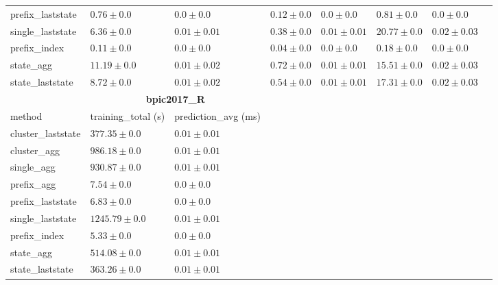 \documentclass[twoside,11pt]{Latex/Classes/PhDthesisPSnPDF}
\begin{document}
\begin{table}[!htbp]
{\begin{tabular}{llllllll}
			prefix\_laststate & $0.76 \pm 0.0$ & $\mathbf{0.0 \pm 0.0}$ & $0.12 \pm 0.0$ & $\mathbf{0.0 \pm 0.0}$ & $0.81 \pm 0.0$ & $\mathbf{0.0 \pm 0.0}$ \\ 
			single\_laststate & $6.36 \pm 0.0$ & $0.01 \pm 0.01$ & $0.38 \pm 0.0$ & $0.01 \pm 0.01$ & $20.77 \pm 0.0$ & $0.02 \pm 0.03$ \\ 
			prefix\_index & $\mathbf{0.11 \pm 0.0}$ & $\mathbf{0.0 \pm 0.0}$ & $\mathbf{0.04 \pm 0.0}$ & $\mathbf{0.0 \pm 0.0}$ & $\mathbf{0.18 \pm 0.0}$ & $\mathbf{0.0 \pm 0.0}$ \\ 
			state\_agg & $11.19 \pm 0.0$ & $0.01 \pm 0.02$ & $0.72 \pm 0.0$ & $0.01 \pm 0.01$ & $15.51 \pm 0.0$ & $0.02 \pm 0.03$ \\ 
			state\_laststate & $8.72 \pm 0.0$ & $0.01 \pm 0.02$ & $0.54 \pm 0.0$ & $0.01 \pm 0.01$ & $17.31 \pm 0.0$ & $0.02 \pm 0.03$ \\ 
			\bottomrule
			\toprule
			& \multicolumn{2}{c}{{\bfseries bpic2017\_R}} \\ \cmidrule(lr){2-3} \cmidrule(lr){4-5} \cmidrule(lr){6-7}
			method  & training\_total (s) & prediction\_avg (ms) \\ \midrule
			cluster\_laststate & $377.35 \pm 0.0$ & $0.01 \pm 0.01$ \\ 
			cluster\_agg & $986.18 \pm 0.0$ & $0.01 \pm 0.01$ \\ 
			single\_agg & $930.87 \pm 0.0$ & $0.01 \pm 0.01$ \\ 
			prefix\_agg & $7.54 \pm 0.0$ & $\mathbf{0.0 \pm 0.0}$ \\ 
			prefix\_laststate & $6.83 \pm 0.0$ & $\mathbf{0.0 \pm 0.0}$ \\ 
			single\_laststate & $1245.79 \pm 0.0$ & $0.01 \pm 0.01$ \\ 
			prefix\_index & $\mathbf{5.33 \pm 0.0}$ & $\mathbf{0.0 \pm 0.0}$ \\ 
			state\_agg & $514.08 \pm 0.0$ & $0.01 \pm 0.01$ \\ 
			state\_laststate & $363.26 \pm 0.0$ & $0.01 \pm 0.01$ \\ 
			\bottomrule
			
			
		\end{tabular}%
	}
	
	
\end{table}

\end{document}
